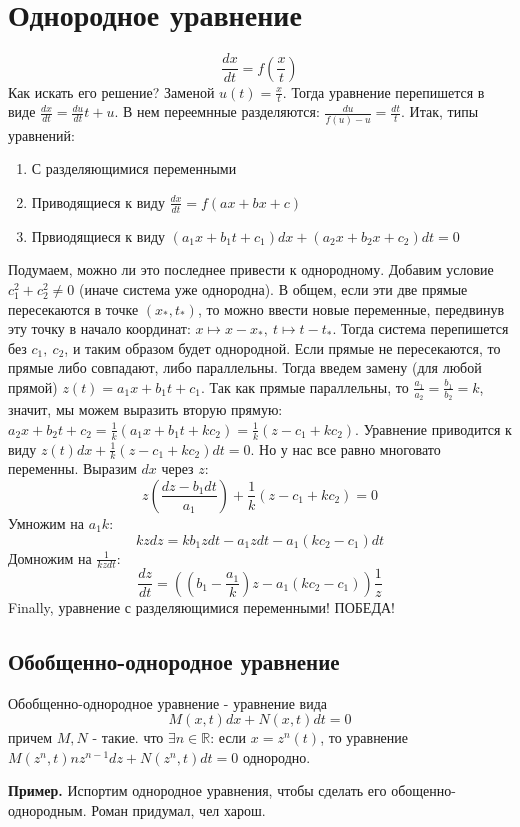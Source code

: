 \section{Однородное уравнение}
$$\frac{dx}{dt}=f\left(\frac{x}{t}\right)$$ 
Как искать его решение? Заменой $u(t)=\frac{x}{t}$. 
Тогда уравнение перепишется в виде $\frac{dx}{dt}=\frac{du}{dt}t+u$.
В нем переемнные разделяются: $\frac{du}{f(u)-u}=\frac{dt}{t}$. 
Итак, типы уравнений:
\begin{enumerate}
    \item С разделяющимися переменными
    \item Приводящиеся к виду $\frac{dx}{dt}=f(ax+bx+c)$ 
    \item Првиодящиеся к виду $(a_1x+b_1t+c_1)dx+(a_2x+b_2x+c_2)dt=0$
\end{enumerate}
Подумаем, можно ли это последнее привести к однородному. Добавим условие 
$c_1^2+c_2^2\ne0$ (иначе система уже однородна). В общем, если эти 
две прямые пересекаются в точке
$(x_*,t_*)$, то можно ввести новые переменные, передвинув эту точку в начало
координат: $x\mapsto x-x_*,~t\mapsto t-t_*$. Тогда система перепишется 
без $c_1,~c_2$, и таким образом будет однородной. Если прямые не пересекаются, 
то прямые либо совпадают, либо параллельны. Тогда введем замену (для любой 
прямой) $z(t)=a_1x+b_1t+c_1$. Так как прямые параллельны, то
$\frac{a_1}{a_2}=\frac{b_1}{b_2}=k$, значит, мы можем выразить 
вторую прямую: $a_2x+b_2t+c_2=\frac{1}{k}(a_1x+b_1t+kc_2)=\frac{1}{k}(z-
c_1+kc_2)$. Уравнение приводится к виду $z(t)dx+\frac{1}{k}(z-c_1+kc_2)dt=0$.
Но у нас все равно многовато переменны. Выразим $dx$ через  $z$:
$$z(\frac{dz-b_1dt}{a_1})+\frac{1}{k}(z-c_1+kc_2)=0$$ 
Умножим на $a_1k$:
 $$kzdz=kb_1zdt-a_1zdt-a_1(kc_2-c_1)dt$$ 
Домножим на $\frac{1}{kzdt}$:
$$\frac{dz}{dt}=((b_1-\frac{a_1}{k})z-a_1(kc_2-c_1))\frac{1}{z}$$ 
Finally, уравнение с разделяющимися переменными! ПОБЕДА!
\subsection{Обобщенно-однородное уравнение}
\begin{defin}
Обобщенно-однородное уравнение - уравнение вида
$$M(x,t)dx+N(x,t)dt=0$$ 
причем $M,N$ - такие. что  $\exists n\in\mathbb{R}$: если
$x=z^n(t)$, то уравнение  $M(z^n,t)nz^{n-1}dz+N(z^n,t)dt=0$ однородно.
\end{defin}
\textbf{Пример.} Испортим однородное уравнения, чтобы сделать его 
обощенно-однородным. Роман придумал, чел харош.

